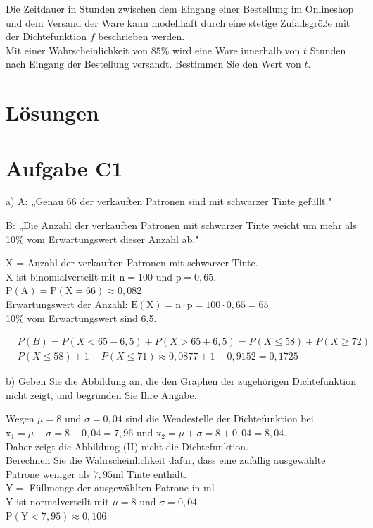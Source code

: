 \documentclass[10pt]{article}
\begin{document}
Die Zeitdauer in Stunden zwischen dem Eingang einer Bestellung im Onlineshop und dem Versand der Ware kann modellhaft durch eine stetige Zufallsgröße mit der Dichtefunktion $f$ beschrieben werden.\\
Mit einer Wahrscheinlichkeit von $85 \%$ wird eine Ware innerhalb von $t$ Stunden nach Eingang der Bestellung versandt. Bestimmen Sie den Wert von $t$.

\section*{Lösungen}
\section*{Aufgabe C1}
a) A: „Genau 66 der verkauften Patronen sind mit schwarzer Tinte gefüllt."

B: „Die Anzahl der verkauften Patronen mit schwarzer Tinte weicht um mehr als 10\% vom Erwartungswert dieser Anzahl ab."

X = Anzahl der verkauften Patronen mit schwarzer Tinte.\\
X ist binomialverteilt mit $\mathrm{n}=100$ und $\mathrm{p}=0,65$.\\
$\mathrm{P}(\mathrm{A})=\mathrm{P}(\mathrm{X}=66) \approx 0,082$\\
Erwartungswert der Anzahl: $\mathrm{E}(\mathrm{X})=\mathrm{n} \cdot \mathrm{p}=100 \cdot 0,65=65$\\
10\% vom Erwartungswert sind 6,5.

$$
\begin{aligned}
& P(B)=P(X<65-6,5)+P(X>65+6,5)=P(X \leq 58)+P(X \geq 72) \\
& P(X \leq 58)+1-P(X \leq 71) \approx 0,0877+1-0,9152=0,1725
\end{aligned}
$$

b) Geben Sie die Abbildung an, die den Graphen der zugehörigen Dichtefunktion nicht zeigt, und begründen Sie Ihre Angabe.

Wegen $\mu=8$ und $\sigma=0,04$ sind die Wendestelle der Dichtefunktion bei $\mathrm{x}_{1}=\mu-\sigma=8-0,04=7,96$ und $\mathrm{x}_{2}=\mu+\sigma=8+0,04=8,04$.\\
Daher zeigt die Abbildung (II) nicht die Dichtefunktion.\\
Berechnen Sie die Wahrscheinlichkeit dafür, dass eine zufällig ausgewählte Patrone weniger als $7,95 \mathrm{ml}$ Tinte enthält.\\
$\mathrm{Y}=$ Füllmenge der ausgewählten Patrone in ml\\
Y ist normalverteilt mit $\mu=8$ und $\sigma=0,04$\\
$\mathrm{P}(\mathrm{Y}<7,95) \approx 0,106$
\end{document}
